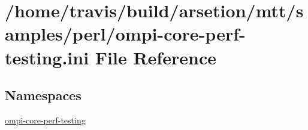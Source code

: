 \hypertarget{ompi-core-perf-testing_8ini}{\section{/home/travis/build/arsetion/mtt/samples/perl/ompi-\/core-\/perf-\/testing.ini File Reference}
\label{ompi-core-perf-testing_8ini}
}
\subsection*{Namespaces}
\begin{DoxyCompactItemize}
\item 
\hyperlink{namespaceompi-core-perf-testing}{ompi-\/core-\/perf-\/testing}
\end{DoxyCompactItemize}
